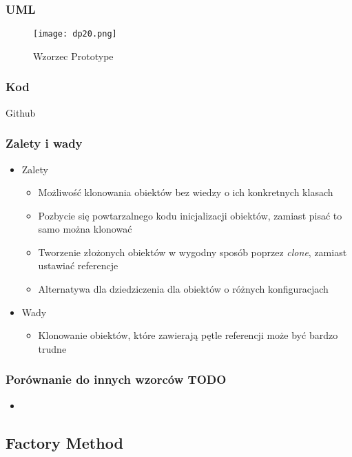 \documentclass[a4paper,15pt]{article}
\begin{document}
\subsubsection{UML}


\begin{figure}[H]
\centering
  \texttt{[image: dp20.png]}
  \caption{Wzorzec Prototype}
\end{figure}

\subsubsection{Kod}
Github

\subsubsection{Zalety i wady}


\begin{itemize}
\item Zalety
\begin{itemize}
\item Możliwość klonowania obiektów bez wiedzy o ich konkretnych klasach
\item Pozbycie się powtarzalnego kodu inicjalizacji obiektów, zamiast pisać to samo można klonować
\item Tworzenie złożonych obiektów w wygodny sposób poprzez \textit{clone}, zamiast ustawiać referencje
\item Alternatywa dla dziedziczenia dla obiektów o różnych konfiguracjach
\end{itemize}
\item Wady
\begin{itemize}
\item Klonowanie obiektów, które zawierają pętle referencji może być bardzo trudne
\end{itemize}
\end{itemize}


\subsubsection{Porównanie do innych wzorców TODO}
\begin{itemize}
\item
\end{itemize}



\newpage
\subsection{Factory Method}
\end{document}
